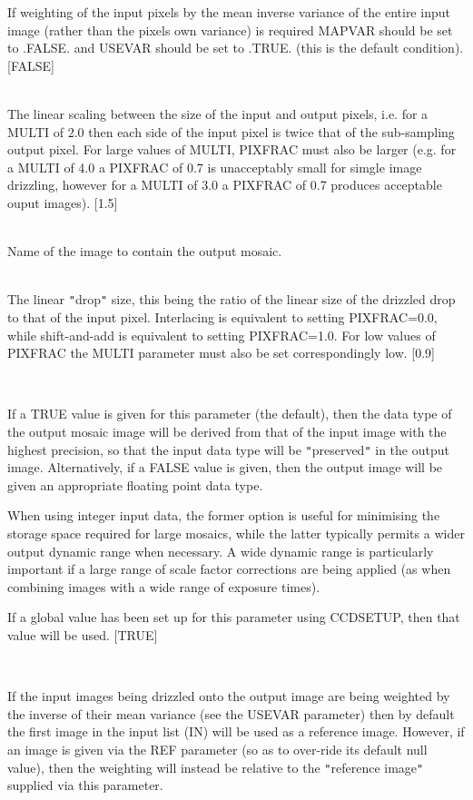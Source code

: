 \documentclass[twoside,11pt]{article}
\renewcommand{\_}{\texttt{\symbol{95}}}
\newcommand{\sstsubsection}[1]{ \item[{#1}] \mbox{} \\}
\newcommand{\sstsubsection}[1]{\item[{#1}]}
\begin{document}
{{{         If weighting of the input pixels by the mean inverse variance
         of the entire input image (rather than the pixels own variance)
         is required MAPVAR should be set to .FALSE. and USEVAR should
         be set to .TRUE. (this is the default condition).
         [FALSE]
      }
      \sstsubsection{
         MULTI = \_DOUBLE (Read)
      }{
         The linear scaling between the size of the input and output
         pixels, i.e. for a MULTI of 2.0 then each side of the input
         pixel is twice that of the sub-sampling output pixel. For large
         values of MULTI, PIXFRAC must also be larger (e.g. for a MULTI
         of 4.0 a PIXFRAC of 0.7 is unacceptably small for simgle image
         drizzling, however for a MULTI of 3.0 a PIXFRAC of 0.7 produces
         acceptable ouput images).
         [1.5]
      }
      \sstsubsection{
         OUT = NDF (Write)
      }{
         Name of the image to contain the output mosaic.
      }
      \sstsubsection{
         PIXFRAC = \_DOUBLE (Read)
      }{
         The linear {\tt "}drop{\tt "} size, this being the ratio of the linear
         size of the drizzled drop to that of the input pixel. Interlacing
         is equivalent to setting PIXFRAC=0.0, while shift-and-add is
         equivalent to setting PIXFRAC=1.0. For low values of PIXFRAC the
         MULTI parameter must also be set correspondingly low.
         [0.9]
      }
      \sstsubsection{
         PRESERVE = \_LOGICAL (Read)
      }{
         If a TRUE value is given for this parameter (the default),
         then the data type of the output mosaic image will be derived
         from that of the input image with the highest precision, so that
         the input data type will be {\tt "}preserved{\tt "} in the output image.
         Alternatively, if a FALSE value is given, then the output image
         will be given an appropriate floating point data type.
 
         When using integer input data, the former option is useful for
         minimising the storage space required for large mosaics, while
         the latter typically permits a wider output dynamic range when
         necessary. A wide dynamic range is particularly important if a
         large range of scale factor corrections are being applied (as
         when combining images with a wide range of exposure times).
 
         If a global value has been set up for this parameter using
         CCDSETUP, then that value will be used.
         [TRUE]
      }
      \sstsubsection{
         REF = NDF (Read)
      }{
         If the input images being drizzled onto the output image are being
         weighted by the inverse of their mean variance (see the USEVAR
         parameter) then by default the first image in the input
         list (IN) will be used as a reference image. However, if an image
         is given via the REF parameter (so as to over-ride its default
         null value), then the weighting will instead be relative to
         the {\tt "}reference image{\tt "} supplied via this parameter.

}}}
\end{document}
